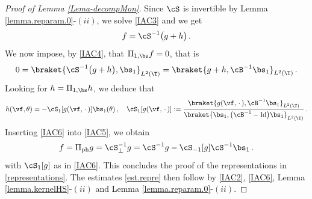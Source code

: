 \documentclass[a4paper,reqno,10pt]{article}
\begin{document}
\begin{proof}[Proof of Lemma \ref{Lema-decompMon}]
	Since $\cS$ is invertible by Lemma \ref{lemma.reparam.0}-$(ii)$, we solve \eqref{IAC3} and  we get
	\begin{equation}\label{IAC5}
		f= \cS^{-1}\big( g+ h  \big)\,.
	\end{equation}
	We now impose, by \eqref{IAC4}, that $\Pi_{1,\bs}f = 0$, that is 
    \begin{equation}
        0 = \braket{\cS^{-1}\big( g + h \big), \bs_{1}}_{L^2(\T)}  = \braket{ g+h, \cB^{-1}\bs_{1}}_{L^2(\T)}  \,.
    \end{equation}
    Looking for $h=\Pi_{1,\bs} h$, we deduce that
    \begin{equation}\label{IAC6}
        h(\vf,\theta) = - \cS_{1}[g(\vf,\,\cdot\,)] \bs_{1}(\theta)\,, \quad \cS_{1}[g(\vf,\,\cdot\,)]:=\frac{\braket{g(\vf,\,\cdot\,),\cB^{-1}\bs_{1}}_{L^2(\T)}}{\braket{\bs_{1},\big(\cB^{-1}-{\rm Id}\big)\bs_{1}}_{L^2(\T)}} \,.
    \end{equation}
    Inserting \eqref{IAC6} into \eqref{IAC5}, we obtain
    \begin{equation}
        f = \Pi_{\rm ph} g = \cS_{\perp}^{-1} g = \cS^{-1}g - \cS_{-1}[g] \cS^{-1}\bs_{1} \,.
    \end{equation}
    with $\cS_{1}[g]$ as in \eqref{IAC6}. This concludes the proof of the representations in \eqref{representations}. The estimates \eqref{est.repre} then follow by \eqref{IAC2}, \eqref{IAC6}, Lemma \ref{lemma.kernelHS}-$(ii)$ and Lemma \ref{lemma.reparam.0}-$(ii)$.
\end{proof}
\end{document}
